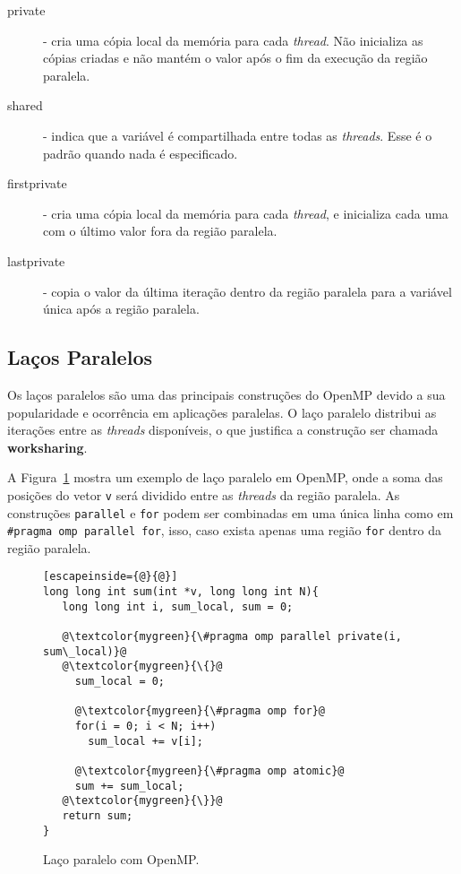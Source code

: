 \begin{description}
\item[private] - cria uma cópia local da memória para cada \textit{thread}. Não inicializa as cópias criadas e não mantém o valor após o fim da execução da região paralela.
\item[shared] - indica que a variável é compartilhada entre todas as \textit{threads}. Esse é o padrão quando nada é especificado.
\item[firstprivate] - cria uma cópia local da memória para cada \textit{thread}, e inicializa cada uma com o último valor fora da região paralela.
\item[lastprivate] - copia o valor da última iteração dentro da região paralela para a variável única após a região paralela.
\end{description}

\subsection{Laços Paralelos}
\label{sec:omp:loop}

Os laços paralelos são uma das principais construções do OpenMP devido a sua popularidade e ocorrência em aplicações paralelas. O laço paralelo distribui as iterações entre as \textit{threads} disponíveis, o que justifica a construção ser chamada \textbf{worksharing}.

A Figura~\ref{fig:omp:loop} mostra um exemplo de laço paralelo em OpenMP, onde a soma das posições do vetor \texttt{v} será dividido entre as \textit{threads} da região paralela. As construções \texttt{parallel} e \texttt{for} podem ser combinadas em uma única linha como em \texttt{\#pragma omp parallel for}, isso, caso exista apenas uma região \texttt{for} dentro da região paralela.

\begin{figure}[!htb]
\centering
\begin{lstlisting}[escapeinside={@}{@}]
long long int sum(int *v, long long int N){
   long long int i, sum_local, sum = 0;

   @\textcolor{mygreen}{\#pragma omp parallel private(i, sum\_local)}@
   @\textcolor{mygreen}{\{}@
     sum_local = 0;

     @\textcolor{mygreen}{\#pragma omp for}@
     for(i = 0; i < N; i++)
       sum_local += v[i];

     @\textcolor{mygreen}{\#pragma omp atomic}@
     sum += sum_local;
   @\textcolor{mygreen}{\}}@
   return sum;
}
\end{lstlisting}
\caption{Laço paralelo com OpenMP.}
\label{fig:omp:loop}
\end{figure}

